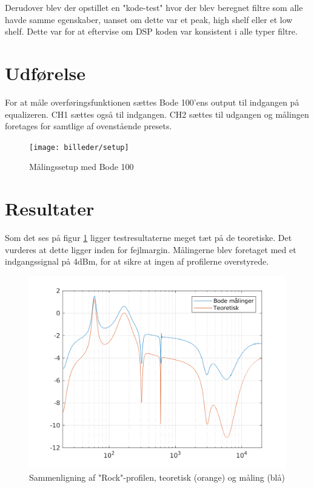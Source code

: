 Derudover blev der opstillet en "kode-test" hvor der blev beregnet filtre som alle havde samme egenskaber, uanset om dette var et peak, high shelf eller et low shelf. Dette var for at eftervise om DSP koden var konsistent i alle typer filtre. 

\section{Udførelse}
For at måle overføringsfunktionen sættes Bode 100'ens output til indgangen på equalizeren. CH1 sættes også til indgangen. CH2 sættes til udgangen og målingen foretages for samtlige af ovenstående presets.

\begin{figure}[h!]
	\centering
	\texttt{[image: billeder/setup]}
	\caption{Målingssetup med Bode 100}
\end{figure}	


\section{Resultater}
Som det ses på figur \ref{fig:rock_test} ligger testresultaterne meget tæt på de teoretiske. Det vurderes at dette ligger inden for fejlmargin. Målingerne blev foretaget med et indgangssignal på 4dBm, for at sikre at ingen af profilerne overstyrede.


\begin{figure}[h!]
	\centering
	\includegraphics[width=15cm]{billeder/rock_test}
	\caption{Sammenligning af "Rock"-profilen, teoretisk (orange) og måling (blå)}
	\label{fig:rock_test}
\end{figure}
	

